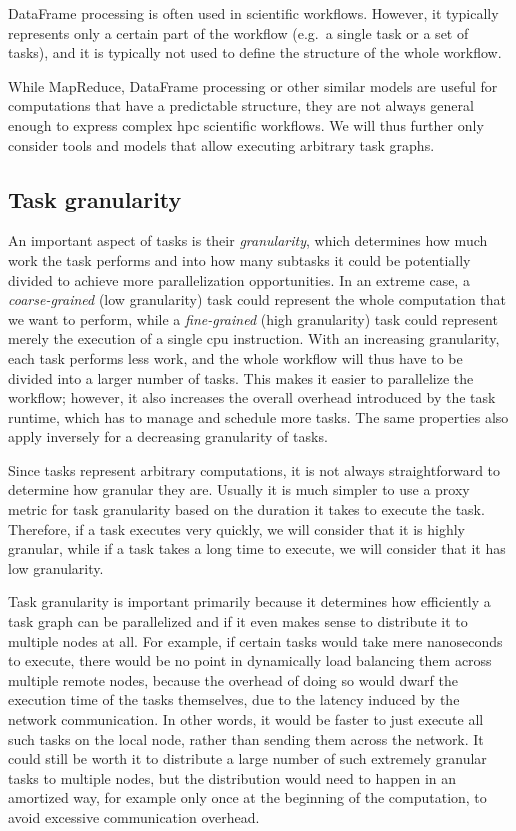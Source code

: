 DataFrame processing is often used in scientific workflows. However, it typically represents only a
certain part of the workflow (e.g.\ a single task or a set of tasks), and it is typically not used
to define the structure of the whole workflow.

While MapReduce, DataFrame processing or other similar models are useful for computations that have
a predictable structure, they are not always general enough to express complex
\gls{hpc} scientific workflows. We will thus further only consider tools and models
that allow executing arbitrary task graphs.

\subsection{Task granularity}
\label{sec:task-granularity}
An important aspect of tasks is their \emph{granularity}, which determines how much work the
task performs and into how many subtasks it could be potentially divided to achieve more
parallelization opportunities. In an extreme case, a \emph{coarse-grained} (low granularity) task could represent
the whole computation that we want to perform, while a \emph{fine-grained} (high granularity) task could represent
merely the execution of a single \gls{cpu} instruction. With an increasing
granularity, each task performs less work, and the whole workflow will thus have to be divided into
a larger number of tasks. This makes it easier to parallelize the workflow; however, it also
increases the overall overhead introduced by the task runtime, which has to manage and schedule
more tasks. The same properties also apply inversely for a decreasing granularity of tasks.

Since tasks represent arbitrary computations, it is not always straightforward to determine how
granular they are. Usually it is much simpler to use a proxy metric for task granularity based on
the duration it takes to execute the task. Therefore, if a task executes very quickly, we will
consider that it is highly granular, while if a task takes a long time to execute, we will consider
that it has low granularity.

Task granularity is important primarily because it determines how efficiently a task graph can be
parallelized and if it even makes sense to distribute it to multiple nodes at all. For example, if
certain tasks would take mere nanoseconds to execute, there would be no point in dynamically load
balancing them across multiple remote nodes, because the overhead of doing so would dwarf the
execution time of the tasks themselves, due to the latency induced by the network communication. In
other words, it would be faster to just execute all such tasks on the local node, rather than
sending them across the network. It could still be worth it to distribute a large number of such
extremely granular tasks to multiple nodes, but the distribution would need to happen in an
amortized way, for example only once at the beginning of the computation, to avoid excessive
communication overhead.

